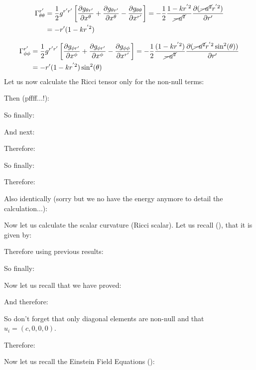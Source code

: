 	\begin{gather*}
		\begin{aligned}
		\Gamma^{r'}_{\theta\theta}&=\frac{1}{2} g^{r'r'}\left[\frac{\partial g_{\theta r'}}{\partial x^\theta}+\frac{\partial g_{\theta r'}}{\partial x^\theta}-\frac{\partial g_{\theta\theta}}{\partial x^{r'}}\right]=-\frac{1}{2}\frac{1-k r^{'2}}{\cancel{-a^2}} \frac{\partial(\cancel{-a^2} r^{'2})}{\partial r'}\\
		&=-r'(1-k r^{'2})
		\end{aligned}
	\end{gather*}
	
	\begin{gather*}
		\begin{aligned}
		\Gamma^{r'}_{\phi\phi}&=\frac{1}{2} g^{r'r'}\left[\frac{\partial g_{\phi r'}}{\partial x^\phi}+\frac{\partial g_{\phi r'}}{\partial x^\phi}-\frac{\partial g_{\phi\phi}}{\partial x^{r'}}\right]=-\frac{1}{2}\frac{(1-k r^{'2})}{\cancel{-a^2}} \frac{\partial(\cancel{-a^2} r^{'2} \sin^2(\theta))}{\partial r'}\\
		&=-r'(1-k r^{'2})\sin^2(\theta)
		\end{aligned}
	\end{gather*}
	Let us now calculate the Ricci tensor only for the non-null terms:
	
	Then (pffff...!):
	
	So finally:
	
	And next:
	
	Therefore:
	
	So finally:
	
	
	Therefore:
	
	Also identically (sorry but we no have the energy anymore to detail the calculation...):
	
	Now let us calculate the scalar curvature (Ricci scalar). Let us recall (), that it is given by:
	
	Therefore using previous results:
	
	So finally:
	
	Now let us recall that we have proved:
	
	And therefore:
	
	So don't forget that only diagonal elements are non-null and that $u_i=(c,0,0,0)$.
	
	Therefore:
	
	Now let us recall the Einstein Field Equations ():
	
